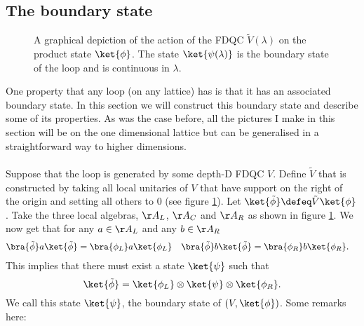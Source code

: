 \subsection{The boundary state}\label{sec:the-boundary-state}
\begin{figure}
	\centering
	\scalebox{0.6}{
		
	}
	\caption{A graphical depiction of the action of the FDQC $\tilde{V}(\lambda)$ on the product state $\ket{\phi}$. The state $\ket{\psi(\lambda)}$ is the boundary state of the loop and is continuous in $\lambda$.}
	\label{fig:G_InvariantContraction_WithLightcone}
\end{figure}
One property that any loop (on any lattice) has is that it has an associated boundary state. In this section we will construct this boundary state and describe some of its properties. As was the case before, all the pictures I make in this section will be on the one dimensional lattice but can be generalised in a straightforward way to higher dimensions.\\\\
Suppose that the loop is generated by some depth-D FDQC $V$. Define $\tilde{V}$ that is constructed by taking all local unitaries of $V$ that have support on the right of the origin and setting all others to $0$ (see figure \ref{fig:G_InvariantContraction_WithLightcone}). Let $\ket{\tilde{\phi}}\defeq \tilde{V}\ket{\phi}$. Take the three local algebras, $\AA_L$, $\AA_C$ and $\AA_R$ as shown in figure \ref{fig:G_InvariantContraction_WithLightcone}. We now get that for any $a\in \AA_L$ and any $b\in\AA_R$
\begin{align}
\bra{\tilde{\phi}}a\ket{\tilde{\phi}}&=\bra{\phi_L}a\ket{\phi_L}&\bra{\tilde{\phi}}b\ket{\tilde{\phi}}&=\bra{\phi_R}b\ket{\phi_R}.
\end{align}
This implies that there must exist a state $\ket{\psi}$ such that
\begin{equation}
\ket{\tilde{\phi}}=\ket{\phi_L}\otimes\ket{\psi}\otimes\ket{\phi_R}.
\end{equation}
We call this state $\ket{\psi}$, the boundary state of $(V,\ket{\phi})$. Some remarks here:
